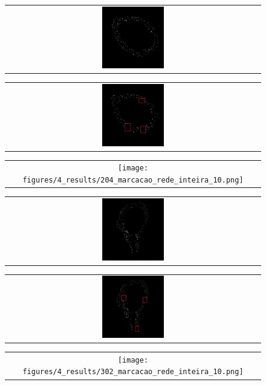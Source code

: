\begin{figure}[h]
    \center
    \begin{tabular}{@{}c@{}}
        \includegraphics[width=0.25\textwidth]{figures/4_results/204_mask_manual_lower_res.png}
        \\[\abovecaptionskip]
    \end{tabular}
    \begin{tabular}{@{}c@{}}
        \includegraphics[width=0.25\textwidth]{figures/4_results/204_net_mask_gaps_lower_res.png}
        \\[\abovecaptionskip]
    \end{tabular}
    \begin{tabular}{@{}c@{}}
        \texttt{[image: figures/4\_results/204\_marcacao\_rede\_inteira\_10.png]}
        \\[\abovecaptionskip]
    \end{tabular}

    \begin{tabular}{@{}c@{}}
        \includegraphics[width=0.25\textwidth]{figures/4_results/302_mask_manual_lower_res.png}
        \\[\abovecaptionskip]
    \end{tabular}
    \begin{tabular}{@{}c@{}}
        \includegraphics[width=0.25\textwidth]{figures/4_results/302_net_mask_gaps_lower_res.png}
        \\[\abovecaptionskip]
    \end{tabular}
    \begin{tabular}{@{}c@{}}
        \texttt{[image: figures/4\_results/302\_marcacao\_rede\_inteira\_10.png]}
        \\[\abovecaptionskip]
    \end{tabular}
  

\end{figure}
